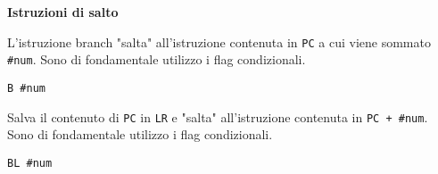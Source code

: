\begin{defn}
	\textbf{Istruzioni di salto}
	
	L'istruzione branch "salta" all'istruzione contenuta in \verb|PC|  a cui viene sommato \verb|#num|. Sono di fondamentale utilizzo i flag condizionali.
	\begin{lstlisting}[style=arm]
	B #num
	\end{lstlisting}
	
	Salva il contenuto di \verb|PC| in \verb|LR| e "salta" all'istruzione contenuta in \verb|PC + #num|. Sono di fondamentale utilizzo i flag condizionali.
	\begin{lstlisting}[style=arm]
	BL #num
	\end{lstlisting}
\end{defn}